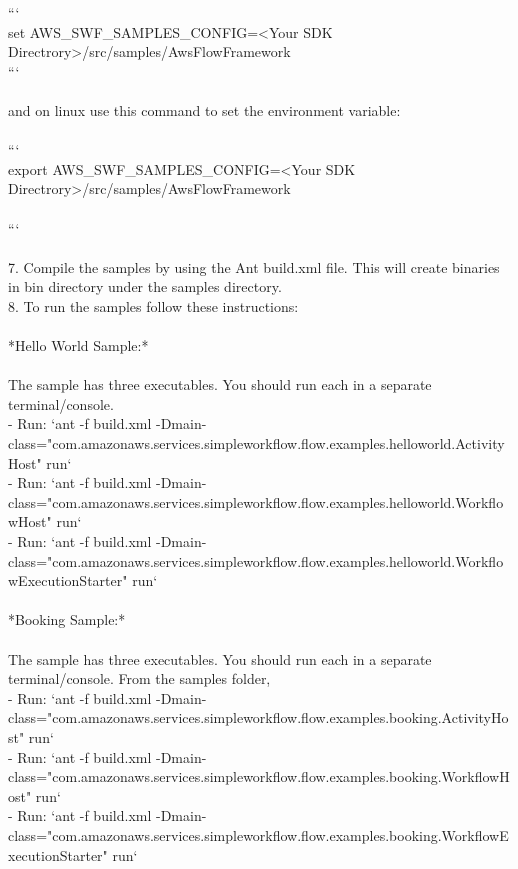 \documentclass{article}
\begin{document}
\begin{textit}
     ``` \\
     set AWS\_\-SWF\_\-SAMPLES\_\-CONFIG=<Your SDK Directrory>/\-src/\-samples/\-AwsFlowFramework \\
     ``` \\ \\

     and on linux use this command to set the environment variable: \\ \\

     ``` \\
     export AWS\_\-SWF\_\-SAMPLES\_\-CONFIG=<Your SDK Directrory>/\-src/\-samples/\-AwsFlowFramework \\ \\
     ``` \\ \\

7.  Compile the samples by using the Ant build.xml file. This will create binaries in bin directory under the samples directory. \\

8.  To run the samples follow these instructions: \\ \\

   *Hello World Sample:* \\ \\

     The sample has three executables. You should run each in a separate terminal/console. \\
     - Run: `ant -f build.xml -Dmain-class="com.\-amazonaws.\-services.\-simpleworkflow.\-flow.\-examples.\-helloworld.\-ActivityHost" run` \\
     - Run: `ant -f build.xml -Dmain-class="com.\-amazonaws.\-services.\-simpleworkflow.\-flow.\-examples.\-helloworld.\-WorkflowHost" run` \\
     - Run: `ant -f build.xml -Dmain-class="com.\-amazonaws.\-services.\-simpleworkflow.\-flow.\-examples.\-helloworld.\-WorkflowExecutionStarter" run` \\ \\


   *Booking Sample:* \\ \\

     The sample has three executables. You should run each in a separate terminal/console. From the samples folder, \\
     - Run: `ant -f build.xml -Dmain-class="com.\-amazonaws.\-services.\-simpleworkflow.\-flow.\-examples.\-booking.\-ActivityHost" run` \\
     - Run: `ant -f build.xml -Dmain-class="com.\-amazonaws.\-services.\-simpleworkflow.\-flow.\-examples.\-booking.\-WorkflowHost" run` \\
     - Run: `ant -f build.xml -Dmain-class="com.\-amazonaws.\-services.\-simpleworkflow.\-flow.\-examples.\-booking.\-WorkflowExecutionStarter" run` \\ \\
\end{textit}
\end{document}
